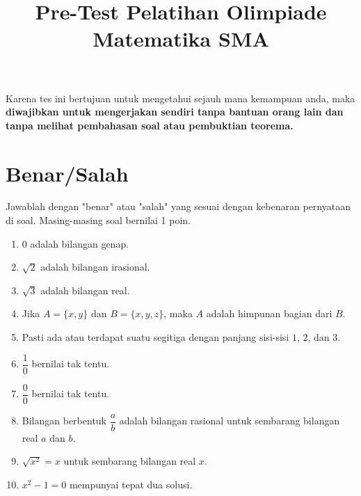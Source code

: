 \documentclass{article}
\title{Pre-Test Pelatihan Olimpiade Matematika SMA}
\date{}
\begin{document}
	\maketitle
	Karena tes ini bertujuan untuk mengetahui sejauh mana kemampuan anda, maka
	\textbf{diwajibkan untuk mengerjakan sendiri tanpa bantuan orang lain dan tanpa melihat pembahasan soal atau pembuktian teorema.}

\section{Benar/Salah}
Jawablah dengan "benar" atau "salah" yang sesuai dengan kebenaran pernyataan di soal. Masing-masing soal bernilai 1 poin.
\begin{enumerate}
	\item 0 adalah bilangan genap.
	
	\item $\sqrt{2}$ adalah bilangan irasional.
	
	\item $\sqrt{3}$ adalah bilangan real.
	
	\item Jika $A = \{x,y\}$ dan $B = \{x,y,z\}$, maka $A$ adalah himpunan bagian dari $B$.
	
	\item Pasti ada atau terdapat suatu segitiga dengan panjang sisi-sisi $1$, $2$, dan $3$.
	
	\item $\dfrac{1}{0}$ bernilai tak tentu.
	
	\item $\dfrac{0}{0}$ bernilai tak tentu.
	
	\item Bilangan berbentuk $\dfrac{a}{b}$ adalah bilangan rasional untuk sembarang bilangan real $a$ dan $b$.
	
	\item $\sqrt{x^2} = x$ untuk sembarang bilangan real $x$.
	
	\item $x^2-1=0$ mempunyai tepat dua solusi.
\end{enumerate}
\end{document}
